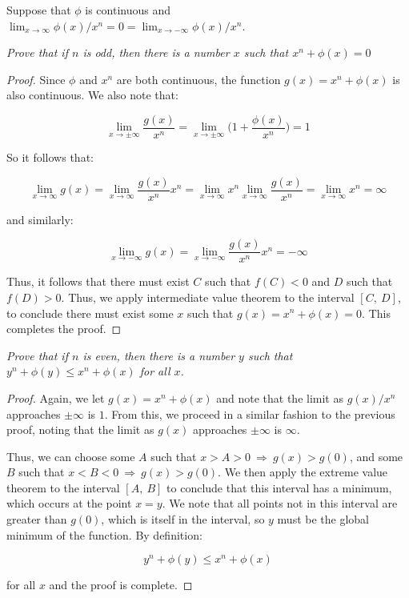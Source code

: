 \documentclass[10pt, oneside]{article}
\newenvironment{problem}[2][Problem]{\begin{trivlist}
\item[\hskip \labelsep {\bfseries #1}\hskip \labelsep {\bfseries #2.}]}{\end{trivlist}}
\begin{document}
    \begin{problem}{7}
      Suppose that $\phi$ is continuous and $\lim_{x \to \infty} \phi(x)/x^n = 0 = \lim_{x \to -\infty} \phi(x)/x^n$.
    \end{problem}

    \textit{Prove that if $n$ is odd, then there is a number $x$ such that $x^n + \phi(x) = 0$}

    \begin{proof}
      Since $\phi$ and $x^n$ are both continuous, the function $g(x) = x^n + \phi(x)$ is also continuous. We also note that:

      $$\lim_{x \to \pm \infty} \frac{g(x)}{x^n} = \lim_{x \to \pm \infty} \big(1 + \frac{\phi(x)}{x^n} \big) = 1$$

      So it follows that:

      $$\lim_{x \to \infty} g(x) = \lim_{x \to \infty} \frac{g(x)}{x^n} x^n = \lim_{x \to \infty} x^n \lim_{x \to \infty} \frac{g(x)}{x^n} = \lim_{x \to \infty} x^n = \infty$$

      and similarly:

      $$\lim_{x \to -\infty} g(x) = \lim_{x \to -\infty} \frac{g(x)}{x^n} x^n = -\infty$$

      Thus, it follows that there must exist $C$ such that $f(C) < 0$ and $D$ such that $f(D) > 0$. Thus, we apply intermediate value theorem to the interval
      $[C, \ D]$, to conclude there must exist some $x$ such that $g(x) = x^n + \phi(x) = 0$. This completes the proof.
    \end{proof}

    \textit{Prove that if $n$ is even, then there is a number $y$ such that $y^n + \phi(y) \leq x^n + \phi(x)$ for all $x$.}

    \begin{proof}
      Again, we let $g(x) = x^n + \phi(x)$ and note that the limit as $g(x)/x^n$ approaches $\pm \infty$ is $1$. From this, we proceed in a similar
      fashion to the previous proof, noting that the limit as $g(x)$ approaches $\pm \infty$ is $\infty$.
      \newline

      Thus, we can choose some
      $A$ such that $x > A > 0 \ \Rightarrow \ g(x) > g(0)$, and some $B$ such that $x < B < 0 \ \Rightarrow \ g(x) > g(0)$. We then apply the extreme value
      theorem to the interval $[A, \ B]$ to conclude that this interval has a minimum, which occurs at the point $x = y$. We note that all points not in this interval
      are greater than $g(0)$, which is itself in the interval, so $y$ must be the global minimum of the function. By definition:

      $$y^n + \phi(y) \leq x^n + \phi(x)$$

      for all $x$ and the proof is complete.
    \end{proof}
\end{document}
